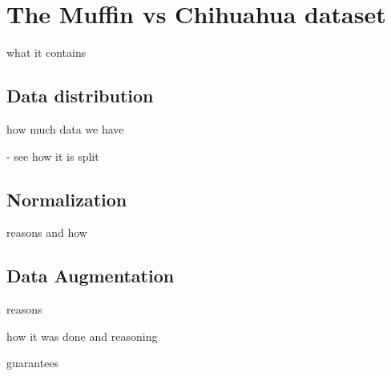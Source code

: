 \section{The Muffin vs Chihuahua dataset}

what it contains
\subsection{Data distribution}
how much data we have

- see how it is split


\subsection{Normalization}
reasons and how

\subsection{Data Augmentation}
reasons

how it was done and reasoning

guarantees